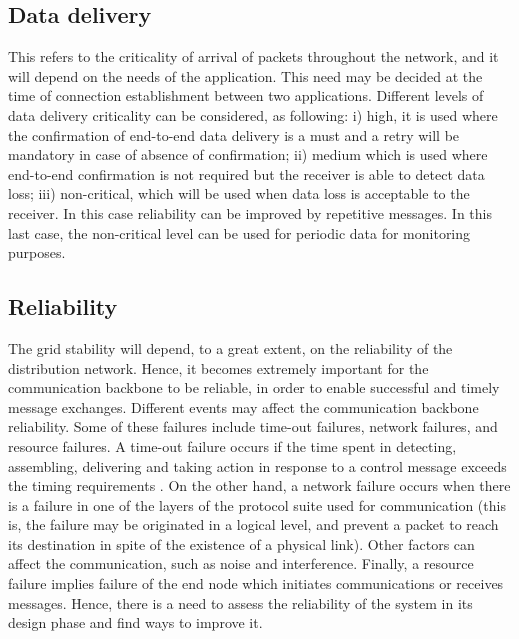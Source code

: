 \documentclass[11pt,final,onecolumn]{IEEEtran}
\begin{document}
\subsection{Data delivery}
This refers to the criticality of arrival of packets throughout the network, and it will depend on the needs of the application. This need may be decided at the time of connection establishment between two applications. Different levels of data delivery criticality can be considered, as following: i) high, it is used where the confirmation of end-to-end data delivery is a must and a retry will be mandatory in case of absence of confirmation; ii) medium which is used where end-to-end confirmation is not required but the receiver is able to detect data loss; iii) non-critical, which will be used when data loss is acceptable to the receiver. In this case reliability can be improved by repetitive messages. In this last case, the non-critical level can be used for periodic data for monitoring purposes. 

\subsection{Reliability}
The grid stability will depend, to a great extent, on the reliability of the distribution network. Hence, it becomes extremely important for the communication backbone to be reliable, in order to enable successful and timely message exchanges. Different events may affect the communication backbone reliability. Some of these failures include time-out failures, network failures, and resource failures. A time-out failure occurs if the time spent in detecting, assembling, delivering and taking action in response to a control message exceeds the timing requirements \cite{Wang2011a}. On the other hand, a network failure occurs when there is a failure in one of the layers of the protocol suite used for communication (this is, the failure may be originated in a logical level, and prevent a packet to reach its destination in spite of the existence of a physical link). Other factors can affect the communication, such as noise and interference. Finally, a resource failure implies failure of the end node which initiates communications or receives messages. Hence, there is a need to assess the reliability of the system in its design phase and find ways to improve it.
\end{document}
